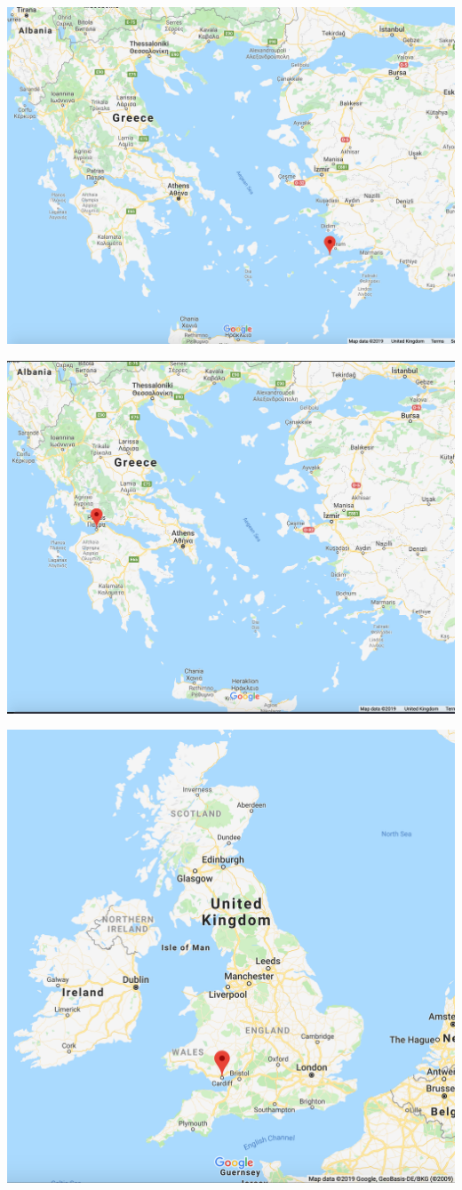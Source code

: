 \documentclass{beamer}
\begin{document}
\begin{frame}
    \begin{center}
    \includegraphics[width=.7\textwidth]{static/kos}
    \end{center}
\end{frame}

\begin{frame}
    \begin{center}
    \includegraphics[width=.7\textwidth]{static/patras}
    \end{center}
\end{frame}

\begin{frame}
    \begin{center}
    \includegraphics[width=.7\textwidth]{static/cardiff}
    \end{center}
\end{frame}
\end{document}
